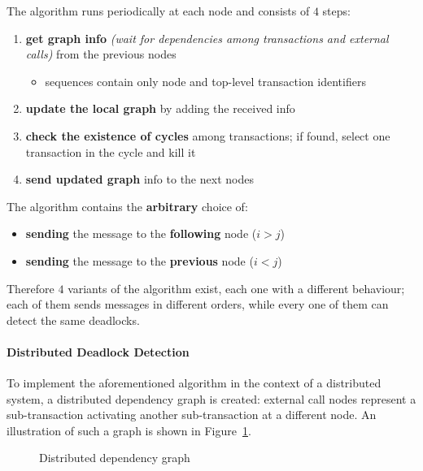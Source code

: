 \documentclass[english]{article}
\begin{document}
\bigskip
The algorithm runs periodically at each node and consists of \(4\) steps:

\begin{enumerate}
  \item \textbf{get graph info} \textit{(wait for dependencies among transactions and external calls)} from the previous nodes
        \begin{itemize}[label=\(\rightarrow\)]
          \item sequences contain only node and top-level transaction identifiers
        \end{itemize}
  \item \textbf{update the local graph} by adding the received info
  \item \textbf{check the existence of cycles} among transactions; if found, select one transaction in the cycle and kill it
  \item \textbf{send updated graph} info to the next nodes
\end{enumerate}

The algorithm contains the \textbf{arbitrary} choice of:

\begin{itemize}
  \item \textbf{sending} the message to the \textbf{following} node (\(i > j\))
  \item \textbf{sending} the message to the \textbf{previous} node (\(i < j\))
\end{itemize}
Therefore \(4\) variants of the algorithm exist, each one with a different behaviour;
each of them sends messages in different orders, while every one of them can detect the same deadlocks.

\paragraph{Distributed Deadlock Detection}

To implement the aforementioned algorithm in the context of a distributed system, a distributed dependency graph is created:
external call nodes represent a sub-transaction activating another sub-transaction at a different node.
An illustration of such a graph is shown in Figure~\ref{fig:distributed-dep-graph}.

\begin{figure}[htbp]
  \centering
  \bigskip
  \caption{Distributed dependency graph}
  \label{fig:distributed-dep-graph}
  \bigskip
\end{figure}
\end{document}
